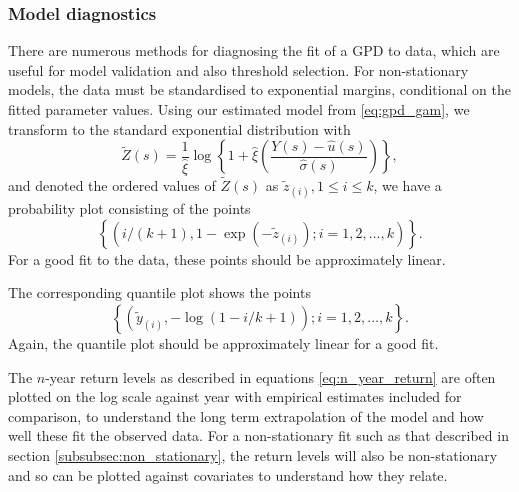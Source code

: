 \documentclass{article}
\numberwithin{equation}{section}
\begin{document}
\subsubsection{Model diagnostics} \label{subsubsec:uni_diagnostics}
There are numerous methods for diagnosing the fit of a GPD to data, which are useful for  model validation and also threshold selection.
For non-stationary models, the data must be standardised to exponential margins, conditional on the fitted parameter values.
Using our estimated model from \eqref{eq:gpd_gam}, we transform to the standard exponential distribution with
\begin{equation*}
    \tilde{Z}(s) = \frac{1}{\hat{\xi}}\log \left\{ 1 + \hat{\xi}\left( \frac{Y(s) - \hat{u}(s)}{\hat{\sigma}(s)} \right) \right\},
\end{equation*}
and denoted the ordered values of $\tilde{Z}(s)$ as $\tilde{z}_{(i)}, 1 \le i \le k$, we have a probability plot consisting of the points
\begin{equation} \label{eq:prob_plot}
  \left\{ \left(i/(k + 1), 
  1 - \exp(-\tilde{z}_{(i)}); i = 1, 2, \ldots, k \right) \right\}.
\end{equation}
For a good fit to the data, these points should be approximately linear.

The corresponding quantile plot shows the points
\begin{equation} \label{eq:quantile_plot}
  \left\{ \left( \tilde{y}_{(i)} , -\log(1 - i/k+1) \right); i = 1, 2, \ldots, k \right\}.
\end{equation}
Again, the quantile plot should be approximately linear for a good fit.

The $n$-year return levels as described in equations \eqref{eq:n_year_return} are often plotted on the log scale against year with empirical estimates included for comparison, to understand the long term extrapolation of the model and how well these fit the observed data. For a non-stationary fit such as that described in section \ref{subsubsec:non_stationary}, the return levels will also be non-stationary and so can be plotted against covariates to understand how they relate.
\end{document}

